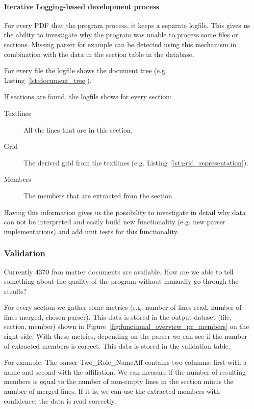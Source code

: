 \documentclass{ou-report}
\begin{document}
\paragraph{Iterative Logging-based development process}
For every PDF that the program process, it keeps a separate logfile. This gives
us the ability to investigate why the program was unable to process some files 
or sections. Missing parser for example can be detected using this mechanism in
combination with the data in the section table in the database.

For every file the logfile shows the document tree (e.g. 
Listing~\ref{lst:document_tree}). 

If sections are found, the logfile shows for every section:
\begin{description}
    \item[Textlines] All the lines that are in this section.
    \item[Grid] The derived grid from the textlines (e.g.         Listing~\ref{lst:grid_representation}).
    \item[Members] The members that are extracted from the section.
\end{description}
Having this information gives us the possibility to 
investigate in detail why data can not be interpreted and easily build new 
functionality (e.g. new parser implementations) and add unit tests for this 
functionality.

\subsubsection{Validation}
\label{sec:front_matter_validation}
Currently 4370 fron matter documents are available. How are we able to tell 
something about the quality of the program without manually go through the 
results?

For every section we gather some metrics (e.g. number of lines read, number of 
lines merged, chosen parser). This data is stored in the output dataset (file, 
section, member) shown in
Figure~\ref{fig:functional_overview_pc_members} on the right side.
With these metrics, depending 
on the parser we can see if the number of extracted members is correct. This 
data is stored in the validation table.

For example, The parser Two\_Role\_NameAff contains two columns: first with a name
and second with the affiliation. We can measure if the number of resulting 
members is equal to the number of non-empty lines in the section minus the number 
of merged lines. If it is, we can use the extracted members with confidence; 
the data is read correctly.
\end{document}
